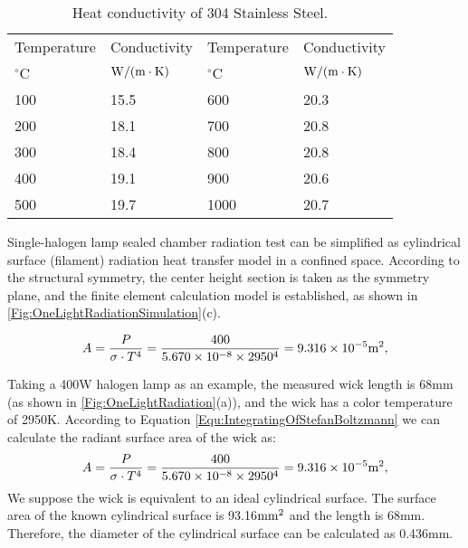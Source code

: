 \begin{table}[htbp]
  \centering
  \caption{Heat conductivity of 304 Stainless Steel.}
    \begin{tabular}{llll}
    \toprule
    Temperature & Conductivity & Temperature & Conductivity \\
    $^{\circ}$C & ${\rm{W/(m}} \cdot {\rm{K)}}$ & $^{\circ}$C & ${\rm{W/(m}} \cdot {\rm{K)}}$ \\
    \midrule
    100   & 15.5  & 600   & 20.3 \\
    200   & 18.1  & 700   & 20.8 \\
    300   & 18.4  & 800   & 20.8 \\
    400   & 19.1  & 900   & 20.6 \\
    500   & 19.7  & 1000  & 20.7 \\
    \bottomrule
    \end{tabular}%
  \label{Tab:SS304HeatTransfer}%
\end{table}%


Single-halogen lamp sealed chamber radiation test can be simplified as cylindrical surface (filament) radiation heat transfer model in a confined space.
According to the structural symmetry, the center height section is taken as the symmetry plane, and the finite element calculation model is established, as shown in \ref{Fig:OneLightRadiationSimulation}(c).

\begin{equation}
A = \frac{P}{\sigma \cdot T^4} = \frac{400}{5.670\times10^{-8}\times2950^4}=9.316\times10^{-5} {\rm{m}}^2,
\end{equation}

Taking a 400W halogen lamp as an example, the measured wick length is 68mm (as shown in \ref{Fig:OneLightRadiation}(a)), and the wick has a color temperature of 2950K. According to Equation \ref{Equ:IntegratingOfStefanBoltzmann} we can calculate the radiant surface area of the wick as:
\begin{equation}
A = \frac{P}{\sigma \cdot T^4} = \frac{400}{5.670\times10^{-8}\times2950^4}=9.316\times10^{-5} {\rm{m }}^2,
\end{equation}
We suppose the wick is equivalent to an ideal cylindrical surface. The surface area of the known cylindrical surface is 93.16${\rm{mm}}^2$ and the length is 68mm. Therefore, the diameter of the cylindrical surface can be calculated as 0.436mm.

